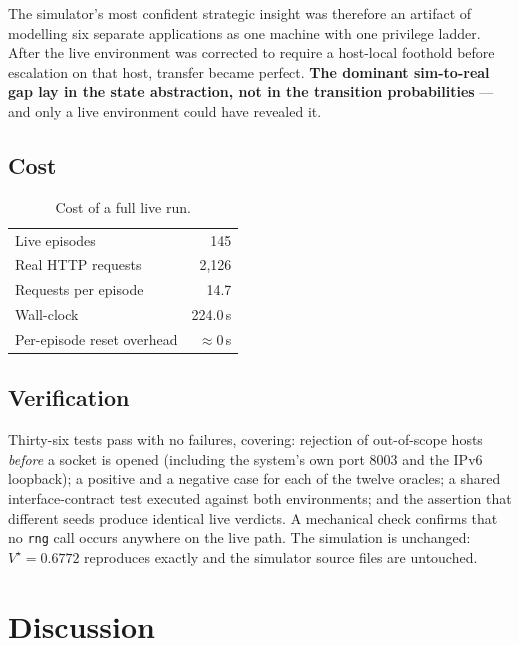\documentclass[11pt,a4paper]{report}
\newcommand{\code}[1]{\texttt{\small #1}}
\begin{document}
The simulator's most confident strategic insight was therefore an artifact of
modelling six separate applications as one machine with one privilege ladder.
After the live environment was corrected to require a host-local foothold before
escalation on that host, transfer became perfect. \textbf{The dominant
sim-to-real gap lay in the state abstraction, not in the transition
probabilities} --- and only a live environment could have revealed it.

\section{Cost}
\begin{table}[h]
\centering
\caption{Cost of a full live run.}
\label{tab:cost}
\begin{tabular}{lr}
\toprule
Live episodes & 145\\
Real HTTP requests & 2{,}126\\
Requests per episode & 14.7\\
Wall-clock & 224.0\,s\\
Per-episode reset overhead & $\approx 0$\,s\\
\bottomrule
\end{tabular}
\end{table}

\section{Verification}
Thirty-six tests pass with no failures, covering: rejection of out-of-scope
hosts \emph{before} a socket is opened (including the system's own port 8003 and
the IPv6 loopback); a positive and a negative case for each of the twelve
oracles; a shared interface-contract test executed against both environments;
and the assertion that different seeds produce identical live verdicts. A
mechanical check confirms that no \code{rng} call occurs anywhere on the live
path. The simulation is unchanged: $V^\star = 0.6772$ reproduces exactly and the
simulator source files are untouched.

\chapter{Discussion}
\end{document}
